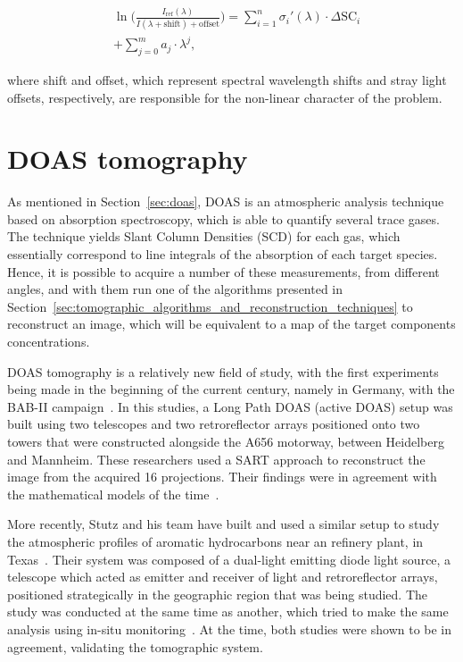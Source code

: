 \begin{align}
      \label{eq:DOAS_nonLinear}
      &\ln\Big( \frac{I_\mathrm{ref}(\lambda)}{I(\lambda + \mathrm{shift}) + \mathrm{offset}} \Big) = \sum_{i = 1}^{n} \sigma_{i}{'}(\lambda) \cdot \Delta \mathrm{SC}_{i} \nonumber\\
      &+ \sum_{j = 0}^{m} a_{j} \cdot \lambda^{j},
\end{align}

where shift and offset, which represent spectral wavelength shifts and
stray light offsets, respectively, are responsible for the non-linear
character of the problem.

\section{DOAS tomography}%
\label{sec:doas_tomography}

As mentioned in Section~\ref{sec:doas}, DOAS is an atmospheric
analysis technique based on absorption spectroscopy, which is able to
quantify several trace gases. The technique yields Slant Column
Densities (SCD) for each gas, which essentially correspond to line
integrals of the absorption of each target species. Hence, it is
possible to acquire a number of these measurements, from different
angles, and with them run one of the algorithms presented in
Section~\ref{sec:tomographic_algorithms_and_reconstruction_techniques} to reconstruct an image,
which will be equivalent to a map of the target components
concentrations.

DOAS tomography is a relatively new field of study, with the first
experiments being made in the beginning of the current century, namely
in Germany, with the BAB-II campaign~\cite{Laepple2004, Pundt2005}. In
this studies, a Long Path DOAS (active DOAS) setup was built using two
telescopes and two retroreflector arrays positioned onto two towers that
were constructed alongside the A656 motorway, between Heidelberg and
Mannheim. These researchers used a SART approach to reconstruct the
image from the acquired 16 projections. Their findings were in agreement
with the mathematical models of the time~\cite{Pundt2005}.

More recently, Stutz and his team have built and used a similar setup to
study the atmospheric profiles of aromatic hydrocarbons near an refinery
plant, in Texas~\cite{Stutz2016}. Their system was composed of a
dual-light emitting diode light source, a telescope which acted as
emitter and receiver of light and retroreflector arrays, positioned
strategically in the geographic region that was being studied. The study
was conducted at the same time as another, which tried to make the same
analysis using in-situ monitoring~\cite{Olaguer2015}. At the time, both
studies were shown to be in agreement, validating the tomographic
system.

